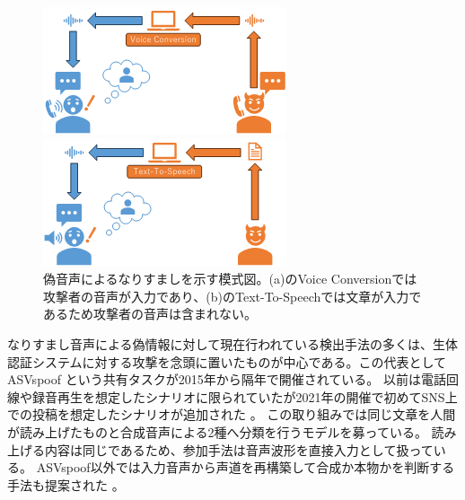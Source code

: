 \begin{figure}[p]
\centering
  \begin{minipage}[b]{0.8\linewidth}
    \centering
    \includegraphics[keepaspectratio, width=0.8\linewidth]{figures/vc.png}
  \end{minipage}
  \begin{minipage}[b]{0.8\linewidth}
    \centering
    \includegraphics[keepaspectratio, width=0.8\linewidth]{figures/tts.png}
  \end{minipage}
  \caption{偽音声によるなりすましを示す模式図。(a)のVoice Conversionでは攻撃者の音声が入力であり、(b)のText-To-Speechでは文章が入力であるため攻撃者の音声は含まれない。}
  \label{fig:vctts}
\end{figure}

なりすまし音声による偽情報に対して現在行われている検出手法の多くは、生体認証システムに対する攻撃を念頭に置いたものが中心である。この代表としてASVspoof \cite{7858696,kinnunen17_interspeech,todisco19_interspeech}という共有タスクが2015年から隔年で開催されている。
以前は電話回線や録音再生を想定したシナリオに限られていたが2021年の開催で初めてSNS上での投稿を想定したシナリオが追加された \cite{yamagishi21_asvspoof}。
この取り組みでは同じ文章を人間が読み上げたものと合成音声による2種へ分類を行うモデルを募っている。
読み上げる内容は同じであるため、参加手法は音声波形を直接入力として扱っている\cite{jung20c_interspeech,9746213}。
ASVspoof以外では入力音声から声道を再構築して合成か本物かを判断する手法も提案された \cite{280020}。

